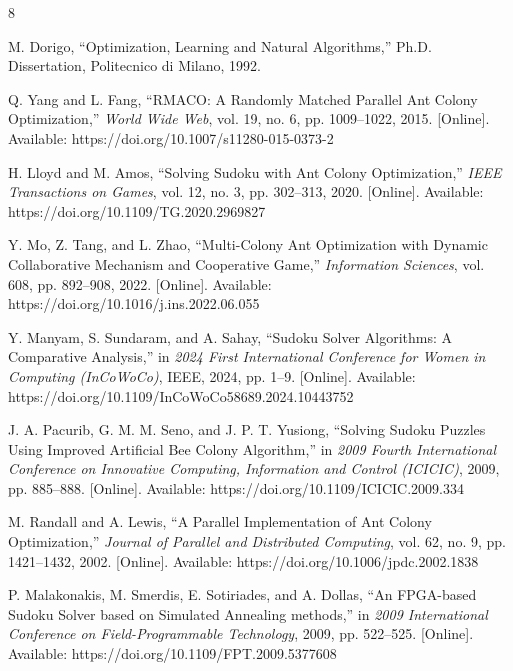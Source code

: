 \documentclass[runningheads]{llncs}
\begin{document}
%
%
%
% 
% 
%
\begin{thebibliography}{8}

    M. Dorigo, ``Optimization, Learning and Natural Algorithms,'' Ph.D. Dissertation, Politecnico di Milano, 1992.

    Q. Yang and L. Fang, ``RMACO: A Randomly Matched Parallel Ant Colony Optimization,'' \emph{World Wide Web}, vol. 19, no. 6, pp. 1009--1022, 2015. [Online]. Available: https://doi.org/10.1007/s11280-015-0373-2

    H. Lloyd and M. Amos, ``Solving Sudoku with Ant Colony Optimization,'' \emph{IEEE Transactions on Games}, vol. 12, no. 3, pp. 302--313, 2020. [Online]. Available: https://doi.org/10.1109/TG.2020.2969827

    Y. Mo, Z. Tang, and L. Zhao, ``Multi-Colony Ant Optimization with Dynamic Collaborative Mechanism and Cooperative Game,'' \emph{Information Sciences}, vol. 608, pp. 892--908, 2022. [Online]. Available: https://doi.org/10.1016/j.ins.2022.06.055

    Y. Manyam, S. Sundaram, and A. Sahay, ``Sudoku Solver Algorithms: A Comparative Analysis,'' in \emph{2024 First International Conference for Women in Computing (InCoWoCo)}, IEEE, 2024, pp. 1--9. [Online]. Available: https://doi.org/10.1109/InCoWoCo58689.2024.10443752

    J. A. Pacurib, G. M. M. Seno, and J. P. T. Yusiong, ``Solving Sudoku Puzzles Using Improved Artificial Bee Colony Algorithm,'' in \emph{2009 Fourth International Conference on Innovative Computing, Information and Control (ICICIC)}, 2009, pp. 885--888. [Online]. Available: https://doi.org/10.1109/ICICIC.2009.334

    M. Randall and A. Lewis, ``A Parallel Implementation of Ant Colony Optimization,'' \emph{Journal of Parallel and Distributed Computing}, vol. 62, no. 9, pp. 1421--1432, 2002. [Online]. Available: https://doi.org/10.1006/jpdc.2002.1838

    P. Malakonakis, M. Smerdis, E. Sotiriades, and A. Dollas, ``An FPGA-based Sudoku Solver based on Simulated Annealing methods,'' in \emph{2009 International Conference on Field-Programmable Technology}, 2009, pp. 522--525. [Online]. Available: https://doi.org/10.1109/FPT.2009.5377608


\end{thebibliography}
\end{document}
